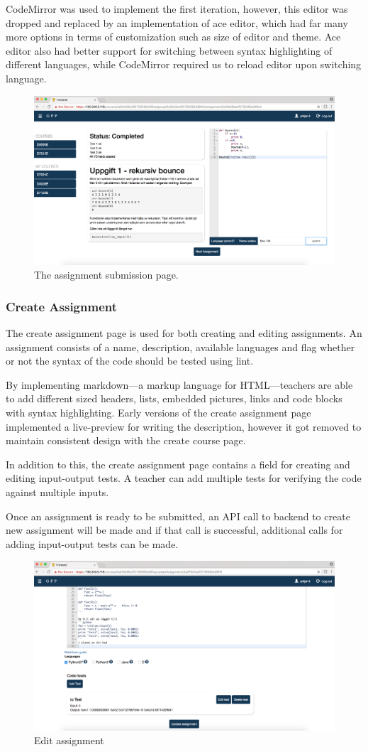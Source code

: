 CodeMirror was used to implement the first iteration, however, this editor was dropped and replaced by an implementation of ace editor, which had far many more options in terms of customization such as size of editor and theme. Ace editor also had better support for switching between syntax highlighting of different languages, while CodeMirror required us to reload editor upon switching language. 
\begin{figure}[H]
    \centering
    \includegraphics[width=.5\textwidth]{img/gppinpictures/assignment.png}
    \caption{The assignment submission page.}
\end{figure}

\subsubsection{Create Assignment}
The create assignment page is used for both creating and editing assignments. An assignment consists of a name, description, available languages and flag whether or not the syntax of the code should be tested using lint. 

By implementing markdown---a markup language for HTML---teachers are able to add different sized headers, lists, embedded pictures, links and code blocks with syntax highlighting. Early versions of the create assignment page implemented a live-preview for writing the description, however it got removed to maintain consistent design with the create course page. 

In addition to this, the create assignment page contains a field for creating and editing input-output tests. A teacher can add multiple tests for verifying the code against multiple inputs.

Once an assignment is ready to be submitted, an API call to backend to create new assignment will be made and if that call is successful, additional calls for adding input-output tests can be made. 
\begin{figure}[hb]
    \centering
    \includegraphics[width=.5\linewidth]{img/gppinpictures/editassignmenttests.png}
    \caption{Edit assignment}
\end{figure}

